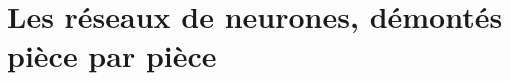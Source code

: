 \documentclass{ml4ebook}     %
\begin{document}
\part{Les réseaux de neurones, démontés pièce par pièce}
% 
% 
% 
% 

\backmatter
\cleardoublepage
\printbibliography[heading=bibintoc]
\end{document}
